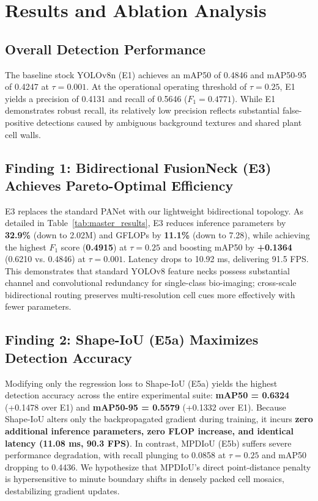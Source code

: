 \documentclass[conference]{IEEEtran}
\begin{document}
\section{Results and Ablation Analysis}

\subsection{Overall Detection Performance}
The baseline stock YOLOv8n (E1) achieves an mAP50 of 0.4846 and mAP50-95 of 0.4247 at $\tau=0.001$. At the operational operating threshold of $\tau = 0.25$, E1 yields a precision of 0.4131 and recall of 0.5646 ($F_1 = 0.4771$). While E1 demonstrates robust recall, its relatively low precision reflects substantial false-positive detections caused by ambiguous background textures and shared plant cell walls.

\subsection{Finding 1: Bidirectional FusionNeck (E3) Achieves Pareto-Optimal Efficiency}
E3 replaces the standard PANet with our lightweight bidirectional topology. As detailed in Table~\ref{tab:master_results}, E3 reduces inference parameters by \textbf{32.9\%} (down to 2.02M) and GFLOPs by \textbf{11.1\%} (down to 7.28), while achieving the highest $F_1$ score (\textbf{0.4915}) at $\tau=0.25$ and boosting mAP50 by \textbf{+0.1364} (0.6210 vs. 0.4846) at $\tau=0.001$. Latency drops to 10.92 ms, delivering 91.5 FPS. This demonstrates that standard YOLOv8 feature necks possess substantial channel and convolutional redundancy for single-class bio-imaging; cross-scale bidirectional routing preserves multi-resolution cell cues more effectively with fewer parameters.

\subsection{Finding 2: Shape-IoU (E5a) Maximizes Detection Accuracy}
Modifying only the regression loss to Shape-IoU (E5a) yields the highest detection accuracy across the entire experimental suite: \textbf{mAP50 = 0.6324} (+0.1478 over E1) and \textbf{mAP50-95 = 0.5579} (+0.1332 over E1). Because Shape-IoU alters only the backpropagated gradient during training, it incurs \textbf{zero additional inference parameters, zero FLOP increase, and identical latency (11.08 ms, 90.3 FPS)}. In contrast, MPDIoU (E5b) suffers severe performance degradation, with recall plunging to 0.0858 at $\tau=0.25$ and mAP50 dropping to 0.4436. We hypothesize that MPDIoU's direct point-distance penalty is hypersensitive to minute boundary shifts in densely packed cell mosaics, destabilizing gradient updates.
\end{document}
